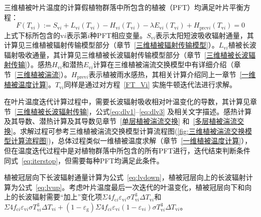 三维植被叶片温度的计算假植物群落中所包含的植被（PFT）均满足叶片平衡方程：
%
\begin{equation}\label{FT_Vi}
  F\left(T_{\mathrm{v}i}\right):=S_{\mathrm{v}i}+L_{\mathrm{v}i}\left(T_{\mathrm{v}i}\right)-H_{\mathrm{v}i}\left(T_{\mathrm{v}i}\right)-\lambda E_{\mathrm{v}i}\left(T_{\mathrm{v}i}\right)+H_{\mathrm{p r c v}i}\left(T_{\mathrm{v}i}\right)=0
\end{equation}
%
上式下标所包含的$\mathrm{v}i$表示第$i$种PFT相应变量。$S_{\mathrm{v}i}$表示太阳短波吸收辐射通量，其计算见三维植被辐射传输模型部分（章节~\ref{三维植被辐射传输模型}）。$L_{\mathrm{v}i}$植被长波辐射吸收通量，其计算见三维植被长波辐射传输模型部分（章节~\ref{三维植被长波辐射传输}）。感热$H_{\mathrm{v}i}$和潜热$E_{\mathrm{v}i}$计算在三维植被湍流交换模型中有详细介绍（章节~\ref{三维植被湍流}）。$H_{\mathrm{prev}i}$表示植被雨水感热，其相关计算介绍同上一章节~\ref{一维植被温度计算}。$T_{\mathrm{v}i}$同样是通过对方程~\eqref{FT_Vi} 实施牛顿迭代法进行求解。

在叶片温度迭代计算过程中，需要长波辐射吸收相对叶温变化的导数，其计算见章节~\ref{三维植被长波辐射传输}，公式\eqref{eq:dlv1}--\eqref{eq:dlv3} 及相关文字描述。感热计算及其导数、潜热计算及其导数见章节~\ref{单层植被湍流交换} 和~\ref{多层植被湍流交换}。求解过程可参考三维植被湍流交换模型计算流程图(\ref{fig:三维植被湍流交换模型计算流程图})，总体过程类似一维植被温度求解（章节~\ref{一维植被温度计算}），但在温度迭代过程中是对植物群落中所包含的所有PFT进行，迭代结束判断条件同式~\eqref{eq:iterstop}，但需要每种PFT均满足此条件。

植被冠层向下长波辐射通量计算为公式~\eqref{eq:lvdown}，植被冠层向上的长波辐射计算为公式~\eqref{eq:lvup}。考虑叶片温度最后一次迭代的叶温变化，植被冠层向下和向上的长波辐射需要“加上”变化项$\Sigma4f_{\mathrm{c}i}\varepsilon_{\mathrm{v}i}\sigma T_{\mathrm{v}i}^3\Delta T_{\mathrm{v}i}$和$\Sigma 4 f_{\mathrm{c}i} \varepsilon_{\mathrm{v}i} \sigma T_{\mathrm{v}i}^{3} \Delta T_{\mathrm{v}i}+\left(1-\varepsilon_{\mathrm{g}}\right) \Sigma 4 f_{\mathrm{c}i} \varepsilon_{\mathrm{v}i}\left(1-\varepsilon_{\mathrm{v}i}\right) \sigma T_{\mathrm{v}i}^{3} \Delta T_{\mathrm{v}i}$。
